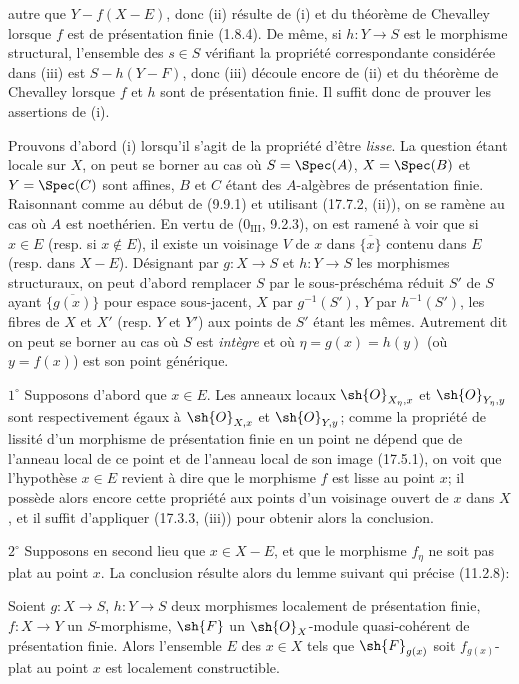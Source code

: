 
autre que $Y-f(X-E)$, donc (ii) résulte de (i) et du théorème de Chevalley lorsque $f$ est de présentation finie (1.8.4). De même, si $h:Y\to S$ est le morphisme structural, l'ensemble des $s\in S$ vérifiant la propriété correspondante considérée dans (iii) est $S-h(Y-F)$, donc (iii) découle encore de (ii) et du théorème de Chevalley lorsque $f$ et $h$ sont de présentation finie. Il suffit donc de prouver les assertions de (i).

Prouvons d'abord (i) lorsqu'il s'agit de la propriété d'être \emph{lisse}. La question étant locale sur $X$, on peut se borner au cas où $S=\Spec(A)$, $X=\Spec(B)$ et $Y=\Spec(C)$ sont affines, $B$ et $C$ étant des $A$-algèbres de présentation finie. Raisonnant comme au début de (9.9.1) et utilisant (17.7.2, (ii)), on se ramène au cas où $A$ est noethérien. En vertu de ($0_{\mathrm{III}}$, 9.2.3), on est ramené à voir que si $x\in E$ (resp. si $x\notin E$), il existe un voisinage $V$ de $x$ dans $\overline{\{x\}}$ contenu dans $E$ (resp. dans $X-E$). Désignant par $g:X\to S$ et $h:Y\to S$ les morphismes structuraux, on peut d'abord remplacer $S$ par le sous-préschéma réduit $S'$ de $S$ ayant $\overline{\{g(x)\}}$ pour espace sous-jacent, $X$ par $g^{-1}(S')$, $Y$ par $h^{-1}(S')$, les fibres de $X$ et $X'$ (resp. $Y$ et $Y'$) aux points de $S'$ étant les mêmes. Autrement dit on peut se borner au cas où $S$ est \emph{intègre} et où $\eta=g(x)=h(y)$ (où $y=f(x)$) est son point générique.

$1^\circ$ Supposons d'abord que $x\in E$. Les anneaux locaux $\sh{O}_{X_\eta,x}$ et $\sh{O}_{Y_\eta,y}$ sont respectivement égaux à $\sh{O}_{X,x}$ et $\sh{O}_{Y,y}$; comme la propriété de lissité d'un morphisme de présentation finie en un point ne dépend que de l'anneau local de ce point et de l'anneau local de son image (17.5.1), on voit que l'hypothèse $x\in E$ revient à dire que le morphisme $f$ est lisse au point $x$; il possède alors encore cette propriété aux points d'un voisinage ouvert de $x$ dans $X$, et il suffit d'appliquer (17.3.3, (iii)) pour obtenir alors la conclusion.

$2^\circ$ Supposons en second lieu que $x\in X-E$, et que le morphisme $f_\eta$ ne soit pas plat au point $x$. La conclusion résulte alors du lemme suivant qui précise (11.2.8):

\begin{lemma}[17.7.11.1]
\label{IV.17.7.11.1}
Soient $g:X\to S$, $h:Y\to S$ deux morphismes localement de présentation finie, $f:X\to Y$ un $S$-morphisme, $\sh{F}$ un $\sh{O}_X$-module quasi-cohérent de présentation finie. Alors l'ensemble $E$ des $x\in X$ tels que $\sh{F}_{g(x)}$ soit $f_{g(x)}$-plat au point $x$ est localement constructible.
\end{lemma}

